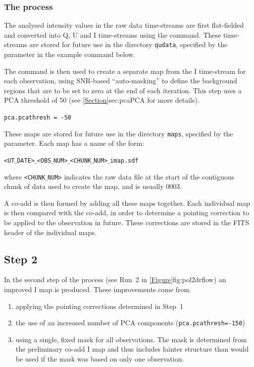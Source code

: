 \subsubsection*{The process}
The analysed intensity values in the raw data time-streams are first
flat-fielded and converted into Q, U and I time-streams using the
 command. These time-streams
are stored for future use in the directory \texttt{qudata}, specified by the
 parameter in the example command below.

The  command is then used to
create a separate map from the I time-stream for each observation,
using SNR-based ``auto-masking'' to define the background regions that
are to be set to zero at the end of each iteration. This step uses a
PCA threshold of 50 (see \cref{Section}{sec:pca}{PCA} for more details).

\texttt{pca.pcathresh = -50}

These maps are stored for future use in the directory \texttt{maps},
specified by the  parameter. Each map has a name of the form:

\texttt{<UT$\_$DATE>$\_$<OBS$\_$NUM>$\_$<CHUNK$\_$NUM>$\_$imap.sdf}

where \texttt{<CHUNK$\_$NUM>} indicates the raw data file at the start
of the contiguous chunk of data used to create the map, and is usually
0003.

A co-add is then formed by adding all these maps together. Each individual map
is then compared with the co-add, in order to determine a pointing correction
to be applied to the observation in future. These corrections are stored
in the FITS header of the individual maps.


\subsection*{Step 2}

In the second step of the process (see Run~2 in
\cref{Figure}{fig:pol2drflow}{}) an improved I map is produced. These
improvements come from
\begin{enumerate}
\item applying the pointing corrections determined in Step~1
\item the use of an increased number of PCA components
  (\texttt{pca.pcathresh=-150})
\item using a single, fixed mask for all observations. The mask is
  determined from the preliminary co-add I map and thus includes
  fainter structure than would be used if the mask was based on only
  one observation.
\end{enumerate}


